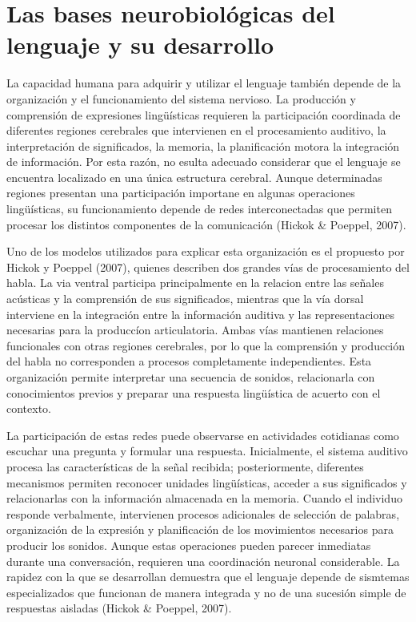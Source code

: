 \documentclass[12pt]{article}
\begin{document}
\section{Las bases neurobiológicas del lenguaje y su desarrollo}

La capacidad humana para adquirir y utilizar el lenguaje también depende de la organización y el funcionamiento del sistema nervioso. La producción y comprensión de expresiones lingüísticas requieren la participación coordinada de diferentes regiones cerebrales que intervienen en el procesamiento auditivo, la interpretación de significados, la memoria, la planificación motora la integración de información. Por esta razón, no esulta adecuado considerar que el lenguaje se encuentra localizado en una única estructura cerebral. Aunque determinadas regiones presentan una participación importane en algunas operaciones lingüísticas, su funcionamiento depende de redes interconectadas que permiten procesar los distintos componentes de la comunicación (Hickok \& Poeppel, 2007).

Uno de los modelos utilizados para explicar esta organización es el propuesto por Hickok y Poeppel (2007), quienes describen dos grandes vías de procesamiento del habla. La via ventral participa principalmente en la relacion entre las señales acústicas y la comprensión de sus significados, mientras que la vía dorsal interviene en la integración entre la información auditiva y las representaciones necesarias para la produccíon articulatoria. Ambas vías mantienen relaciones funcionales con otras regiones cerebrales, por lo que la comprensión y producción del habla no corresponden a procesos completamente independientes. Esta organización permite interpretar una secuencia de sonidos, relacionarla con conocimientos previos y preparar una respuesta lingüística de acuerto con el contexto. 

La participación de estas redes puede observarse en actividades cotidianas como escuchar una pregunta y formular una respuesta. Inicialmente, el sistema auditivo procesa las características de la señal recibida; posteriormente, diferentes mecanismos permiten reconocer unidades lingüísticas, acceder a sus significados y relacionarlas con la información almacenada en la memoria. Cuando el individuo responde verbalmente, intervienen procesos adicionales de selección de palabras, organización de la expresión y planificación de los movimientos necesarios para producir los sonidos. Aunque estas operaciones pueden parecer inmediatas durante una conversación, requieren una coordinación neuronal considerable. La rapidez con la que se desarrollan demuestra que el lenguaje depende de sismtemas especializados que funcionan de manera integrada y no de una sucesión simple de respuestas aisladas (Hickok \& Poeppel, 2007).
\end{document}
